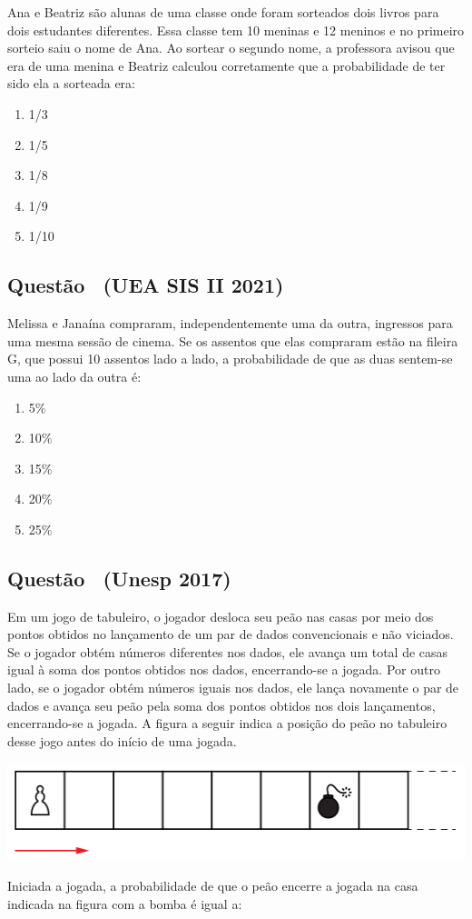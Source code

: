 \documentclass[12pt]{article}
\newcounter{questao}
\newcommand{\novaquestao}[1]{%
	\stepcounter{questao}%
	\subsection*{Questão \thequestao\ (#1)}%
}
\begin{document}
\begin{multicols}{2}
			Ana e Beatriz são alunas de uma classe onde foram sorteados
			dois livros para dois estudantes diferentes. Essa classe tem 10
			meninas e 12 meninos e no primeiro sorteio saiu o nome de Ana. Ao
			sortear o segundo nome, a professora avisou que era de uma menina
			e Beatriz calculou corretamente que a probabilidade de ter sido ela
			a sorteada era:
			
			\begin{enumerate}[label=(\alph*), noitemsep]
				\item {1}/{3}
				\item {1}/{5}
				\item {1}/{8}
				\item {1}/{9}  %
				\item {1}/{10}
			\end{enumerate}
			
		\novaquestao{UEA SIS II 2021}
		
			Melissa e Janaína compraram, independentemente uma da
			outra, ingressos para uma mesma sessão de cinema. Se os
			assentos que elas compraram estão na fileira G, que possui 10
			assentos lado a lado, a probabilidade de que as duas sentem-se
			uma ao lado da outra é:
			
			\begin{enumerate}[label=(\alph*), noitemsep]
				\item 5\%
				\item 10\%
				\item 15\%
				\item 20\%  %
				\item 25\%
			\end{enumerate}
		
		\novaquestao{Unesp 2017}
		
			Em um jogo de tabuleiro, o jogador desloca seu peão nas casas por meio dos pontos obtidos no lançamento de um par de dados convencionais e não viciados. Se o jogador obtém números diferentes nos dados, ele avança um total de casas igual à soma dos pontos obtidos nos dados, encerrando-se a jogada. Por outro lado, se o jogador obtém números iguais nos dados, ele lança novamente o par de dados e avança seu peão pela soma dos pontos obtidos nos dois lançamentos, encerrando-se a jogada. A figura a seguir indica a posição do peão no tabuleiro desse jogo antes do início 
			de uma jogada.
			
			\begin{center}
				\includegraphics[scale=0.5]{imagens/unesp-2017.png}
			\end{center} Iniciada a jogada, a probabilidade de que o peão encerre a jogada na casa indicada na figura com a bomba é igual a:
			

\end{multicols}
\end{document}
